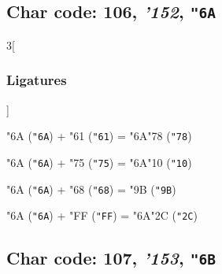 \documentclass{article}
\newlength{\maxcharwidth}
\begin{document}
\subsection{Char code: 106, {\it'152}, {\tt"6A}}
\label{char_106}


\begin{multicols}{3}[\subsubsection{Ligatures}]

{\testfont\char"6A\noboundary} ({\tt"6A}) + {\testfont\char"61\noboundary} ({\tt"61}) = {\testfont\char"6A\noboundary}{\testfont\char"78\noboundary} ({\tt"78}) 

{\testfont\char"6A\noboundary} ({\tt"6A}) + {\testfont\char"75\noboundary} ({\tt"75}) = {\testfont\char"6A\noboundary}{\testfont\char"10\noboundary} ({\tt"10}) 

{\testfont\char"6A\noboundary} ({\tt"6A}) + {\testfont\char"68\noboundary} ({\tt"68}) = {\testfont\char"9B\noboundary} ({\tt"9B}) 

{\testfont\char"6A\noboundary} ({\tt"6A}) + {\testfont\char"FF\noboundary} ({\tt"FF}) = {\testfont\char"6A\noboundary}{\testfont\char"2C\noboundary} ({\tt"2C}) 

\end{multicols}

\subsection{Char code: 107, {\it'153}, {\tt"6B}}
\label{char_107}

\end{document}
